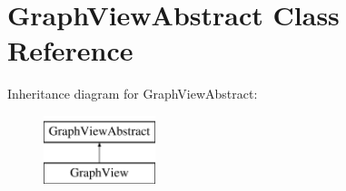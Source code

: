 \hypertarget{class_graph_view_abstract}{\section{Graph\-View\-Abstract Class Reference}
\label{class_graph_view_abstract}
}
Inheritance diagram for Graph\-View\-Abstract\-:\begin{figure}[H]
\begin{center}
\leavevmode
\includegraphics[height=2.000000cm]{class_graph_view_abstract}
\end{center}
\end{figure}
